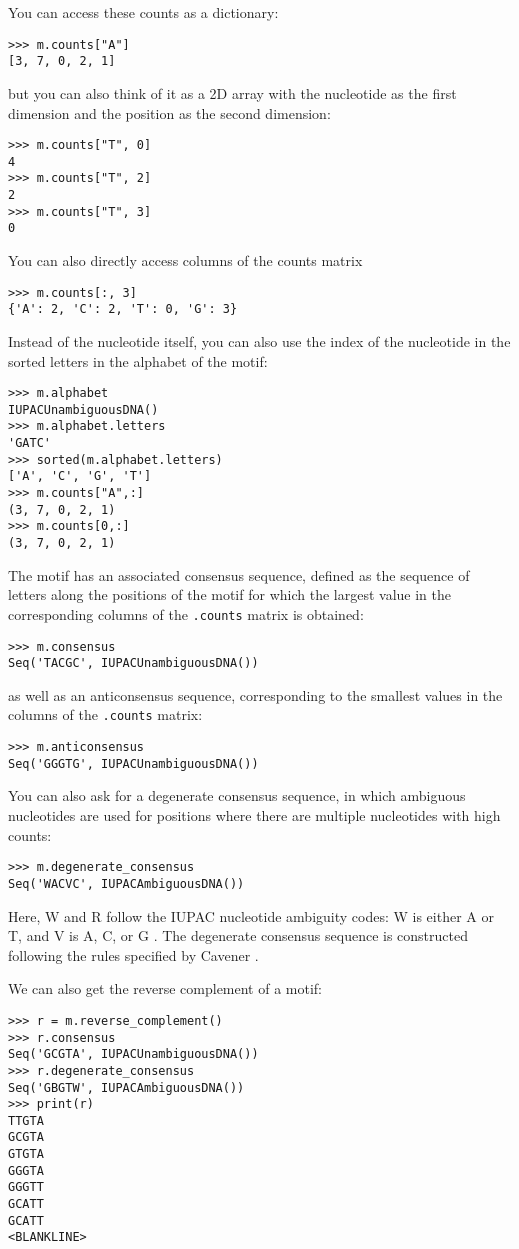 You can access these counts as a dictionary:
\begin{verbatim}
>>> m.counts["A"]
[3, 7, 0, 2, 1]
\end{verbatim}
but you can also think of it as a 2D array with the nucleotide as the first
dimension and the position as the second dimension:
\begin{verbatim}
>>> m.counts["T", 0]
4
>>> m.counts["T", 2]
2
>>> m.counts["T", 3]
0
\end{verbatim}
You can also directly access columns of the counts matrix
\begin{verbatim}
>>> m.counts[:, 3]
{'A': 2, 'C': 2, 'T': 0, 'G': 3}
\end{verbatim}
Instead of the nucleotide itself, you can also use the index of the nucleotide
in the sorted letters in the alphabet of the motif:
\begin{verbatim}
>>> m.alphabet
IUPACUnambiguousDNA()
>>> m.alphabet.letters
'GATC'
>>> sorted(m.alphabet.letters)
['A', 'C', 'G', 'T']
>>> m.counts["A",:]
(3, 7, 0, 2, 1)
>>> m.counts[0,:]
(3, 7, 0, 2, 1)
\end{verbatim}
The motif has an associated consensus sequence, defined as the sequence of
letters along the positions of the motif for which the largest value in the
corresponding columns of the \verb+.counts+ matrix is obtained:
\begin{verbatim}
>>> m.consensus
Seq('TACGC', IUPACUnambiguousDNA())
\end{verbatim}
as well as an anticonsensus sequence, corresponding to the smallest values in
the columns of the \verb+.counts+ matrix:
\begin{verbatim}
>>> m.anticonsensus
Seq('GGGTG', IUPACUnambiguousDNA())
\end{verbatim}
You can also ask for a degenerate consensus sequence, in which ambiguous
nucleotides are used for positions where there are multiple nucleotides with
high counts:
\begin{verbatim}
>>> m.degenerate_consensus
Seq('WACVC', IUPACAmbiguousDNA())
\end{verbatim}
Here, W and R follow the IUPAC nucleotide ambiguity codes: W is either A or T,
and V is A, C, or G \cite{cornish1985}. The degenerate consensus sequence is
constructed following the rules specified by Cavener \cite{cavener1987}.

We can also get the reverse complement of a motif:
\begin{verbatim}
>>> r = m.reverse_complement()
>>> r.consensus
Seq('GCGTA', IUPACUnambiguousDNA())
>>> r.degenerate_consensus
Seq('GBGTW', IUPACAmbiguousDNA())
>>> print(r)
TTGTA
GCGTA
GTGTA
GGGTA
GGGTT
GCATT
GCATT
<BLANKLINE>
\end{verbatim}

